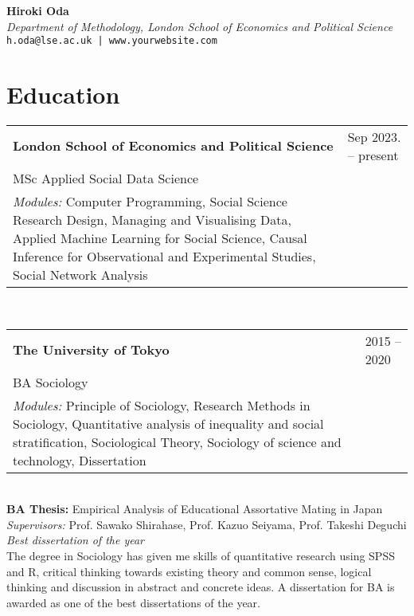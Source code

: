 \documentclass[11pt, a4paper]{article}
\begin{document}
\begin{center}
{\huge \textbf{Hiroki Oda}} \\
{\large \textit{Department of Methodology, London School of Economics and Political Science}} \\
\texttt{h.oda@lse.ac.uk | www.yourwebsite.com} \\
\end{center}


\section*{Education}
\noindent\begin{tabular}{@{}p{}p{}}
\textbf{London School of Economics and Political Science} & \hfill Sep 2023. -- present \\
MSc Applied Social Data Science \\
\textit{Modules:} Computer Programming, Social Science Research Design, Managing and Visualising Data, Applied Machine Learning for Social Science, Causal Inference for Observational and Experimental Studies, Social Network Analysis \\
\end{tabular} \\

\noindent\begin{tabular}{@{}p{}p{}}
\textbf{The University of Tokyo} & \hfill 2015 -- 2020 \\
BA Sociology \\
\textit{Modules:} Principle of Sociology, Research Methods in Sociology, Quantitative analysis of inequality and social stratification, Sociological Theory, Sociology of science and technology, Dissertation \\
\end{tabular} \\

\noindent \textbf{BA Thesis:} Empirical Analysis of Educational Assortative Mating in Japan \\
\textit{Supervisors:} Prof. Sawako Shirahase, Prof. Kazuo Seiyama, Prof. Takeshi Deguchi \\
\textit{Best dissertation of the year} \\

\noindent The degree in Sociology has given me skills of quantitative research using SPSS and R, critical thinking towards existing theory and common sense, logical thinking and discussion in abstract and concrete ideas. A dissertation for BA is awarded as one of the best dissertations of the year. \\
\end{document}
